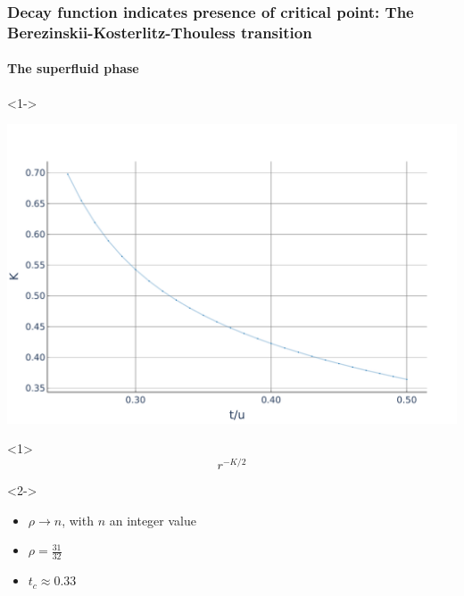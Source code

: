 \documentclass[aspectratio=169]{beamer}
\begin{document}
\begin{frame}
  \frametitle{Decay function indicates presence of critical point: The Berezinskii-Kosterlitz-Thouless transition}
  \framesubtitle{The superfluid phase}
  \begin{onlyenv}<1->
    \begin{center}
      \includegraphics[scale=0.2]{../img/Correlations-K-values.pdf}
    \end{center}
  \end{onlyenv}
  \begin{onlyenv}<1>
    \begin{equation}
      r^{-K/2}
    \end{equation}
  \end{onlyenv}
  \begin{onlyenv}<2->
    \begin{itemize}
      \item<2-> $\rho \rightarrow n$, with $n$ an integer value 
      \item<3-> $\rho = \frac{31}{32}$
      \item<4-> $t_c \approx 0.33$
    \end{itemize}
  \end{onlyenv}
\end{frame}
\end{document}

